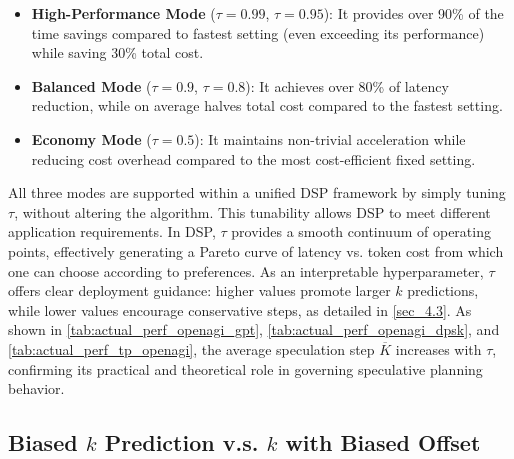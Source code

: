 \begin{itemize}[itemsep=2pt,topsep=0pt,parsep=0pt,partopsep=0pt,leftmargin=20pt]
\item \textbf{High-Performance Mode} ($\tau=0.99$, $\tau=0.95$): It provides over 90\% of the time savings compared to fastest setting (even exceeding its performance) while saving 30\% total cost.
\item \textbf{Balanced Mode} ($\tau=0.9$, $\tau=0.8$): It achieves over 80\% of latency reduction, while on average halves total cost compared to the fastest setting.
\item \textbf{Economy Mode} ($\tau=0.5$): It maintains non-trivial acceleration while reducing cost overhead compared to the most cost-efficient fixed setting.
\end{itemize}

All three modes are supported within a unified DSP framework by simply tuning $\tau$, without altering the algorithm. This tunability allows DSP to meet different application requirements. In DSP, $\tau$ provides a smooth continuum of operating points, effectively generating a Pareto curve of latency vs. token cost from which one can choose according to preferences.
As an interpretable hyperparameter, $\tau$ offers clear deployment guidance: higher values promote larger $k$ predictions, while lower values encourage conservative steps, as detailed in \cref{sec_4.3}.
As shown in \cref{tab:actual_perf_openagi_gpt}, \cref{tab:actual_perf_openagi_dpsk}, and \cref{tab:actual_perf_tp_openagi}, the average speculation step $\overline{K}$ increases with $\tau$, confirming its practical and theoretical role in governing speculative planning behavior.


\subsection{Biased $k$ Prediction v.s. $k$ with Biased Offset}

